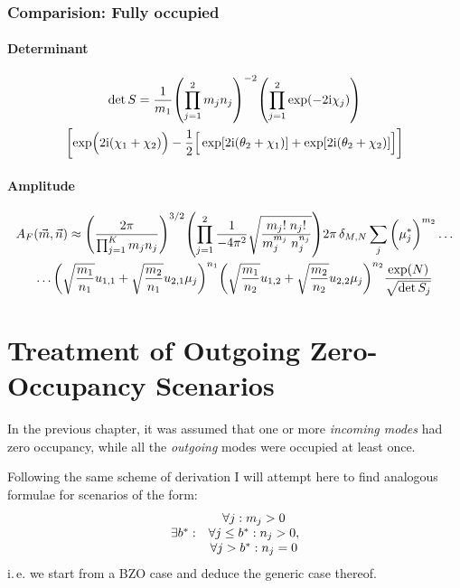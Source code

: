\documentclass[
	english,
	a4paper,
	fontsize=10pt,
	parskip=half,
	titlepage=true,
	DIV=12,
	final
]{scrreprt}
\newcommand*{\ie}{i.\,e.\xspace}
\newcommand*{\iunit}{\ensuremath{\mathrm{i}}}
\begin{document}
\subsection{Comparision: Fully occupied}
\subsubsection{Determinant}
\begin{multline*}
	\det S
=
	\frac{1}{m_1}
	\qty( \prod_{j=1}^{2} m_j n_j)^{-2}
	\qty( \prod_{j=1}^{2} \exp(-2\iunit \chi_j) )
\\
	\qty[
		\exp( \Big. 2\iunit (\chi_1 + \chi_2) )
		-\frac{1}{2} \qty[ \Big.
			\exp[2\iunit (\theta_2 + \chi_1)] +
			\exp[2\iunit (\theta_2 + \chi_2)]
		]
	]
\end{multline*}

\subsubsection{Amplitude}
\begin{multline}
	A_F(\vec{m}, \vec{n})
\approx
	\qty(\frac
		{2\pi}
		{\prod_{j=1}^{K} m_j n_j}
	)^{3/2}
	\qty(
		\prod_{j=1}^{2}
		\frac
			{1}
			{-4\pi^{2}}
		\sqrt{\frac
			{m_j!      \; n_j!}
			{m_j^{m_j} \; n_j^{n_j} }
		}
	)
	2\pi \, \delta_{M,N}
	\sum_{j}
		\qty(\bigg. \mu_j^*)^{m_2}
	\ldots
\\
	\ldots
		\qty(\sqrt{\frac{m_1}{n_1}} u_{1,1}  +  \sqrt{\frac{m_2}{n_1}} u_{2,1} \mu_{j})^{n_1}
		\qty(\sqrt{\frac{m_1}{n_2}} u_{1,2}  +  \sqrt{\frac{m_2}{n_2}} u_{2,2} \mu_{j})^{n_2}
	\frac
		{\exp(N)}
		{\sqrt{\det S_j}}
\end{multline}

\chapter{Treatment of Outgoing Zero-Occupancy Scenarios}
In the previous chapter, it was assumed that one or more \emph{incoming modes} had zero occupancy, while all the \emph{outgoing} modes were occupied at least once.

Following the same scheme of derivation I will attempt here to find analogous formulae for scenarios of the form:
\begin{align}
	\mqty{
						& \forall j : m_j > 0 \\
		\exists b^* :	& \forall j \leq b^* : n_j > 0,\\
						& \forall j   >  b^* : n_j = 0
	}
\end{align}
\ie we start from a BZO case and deduce the generic case thereof.
\end{document}
